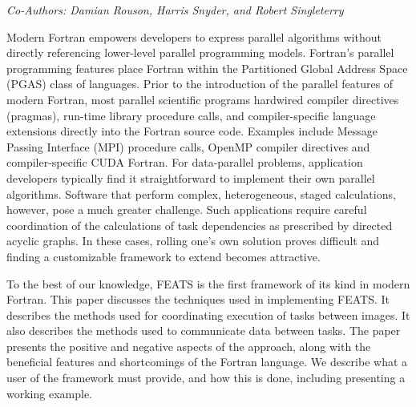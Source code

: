 \begin{center}
\textit{Co-Authors: Damian Rouson, Harris Snyder, and Robert Singleterry}
\end{center} 
Modern Fortran empowers developers to express parallel algorithms without directly referencing lower-level parallel programming models. Fortran’s parallel programming features place Fortran within the Partitioned Global Address Space (PGAS) class of languages. Prior to the introduction of the parallel features of modern Fortran, most parallel scientific programs hardwired compiler directives (pragmas), run-time library procedure calls, and compiler-specific language extensions directly into the Fortran source code. Examples include Message Passing Interface (MPI) procedure calls, OpenMP compiler directives and compiler-specific CUDA Fortran. For data-parallel problems, application developers typically find it straightforward to implement their own parallel algorithms. Software that perform complex, heterogeneous, staged calculations, however, pose a much greater challenge. Such applications require careful coordination of the calculations of task dependencies as prescribed by directed acyclic graphs. In these cases, rolling one’s own solution proves difficult and finding a customizable framework to extend becomes attractive.

To the best of our knowledge, FEATS is the first framework of its kind in modern Fortran. This paper discusses the techniques used in implementing FEATS. It describes the methods used for coordinating execution of tasks between images. It also describes the methods used to communicate data between tasks. The paper presents the positive and negative aspects of the approach, along with the beneficial features and shortcomings of the Fortran language. We describe what a user of the framework must
provide, and how this is done, including presenting a working example.